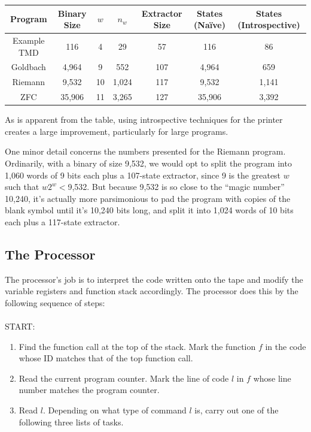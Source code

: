 \documentclass[11pt]{article}
\begin{document}
\begin{center}
    \begin{tabular}{||c c c c c c c||}
    \hline
    Program & Binary Size & $w$ & $n_w$ & Extractor Size & States (Na\"ive) & States (Introspective) \\ [0.5ex]
    \hline\hline
    Example TMD & 116 & 4 & 29 & 57 & 116 & 86 \\
    \hline
    Goldbach & 4,964 & 9 & 552 & 107 & 4,964 & 659 \\
    \hline
    Riemann & 9,532 & 10 & 1,024 & 117 & 9,532 & 1,141 \\
    \hline 
    ZFC & 35,906 & 11 & 3,265 & 127 & 35,906 & 3,392 \\
    \hline
    \end{tabular}
\end{center}
     
As is apparent from the table, using introspective techniques for the printer creates a large improvement, particularly for large programs.

One minor detail concerns the numbers presented for the Riemann program. Ordinarily, with a binary of size 9,532, we would opt to split the program into 1,060 words of 9 bits each plus a 107-state extractor, since 9 is the greatest $w$ such that $w2^w < $9,532. But because 9,532 is so close to the ``magic number'' 10,240, it's actually more parsimonious to pad the program with copies of the blank symbol until it's 10,240 bits long, and split it into 1,024 words of 10 bits each plus a 117-state extractor.

\subsection{The Processor}

The processor's job is to interpret the code written onto the tape and modify the variable registers and function stack accordingly. The processor does this by the following sequence of steps:  \\ \\
START:
\begin{enumerate}
\item Find the function call at the top of the stack. Mark the function $f$ in the code whose ID matches that of the top function call.
\item Read the current program counter. Mark the line of code $l$ in $f$ whose line number matches the program counter.
\item Read $l$. Depending on what type of command $l$ is, carry out one of the following three lists of tasks.
\end{enumerate}
\end{document}
